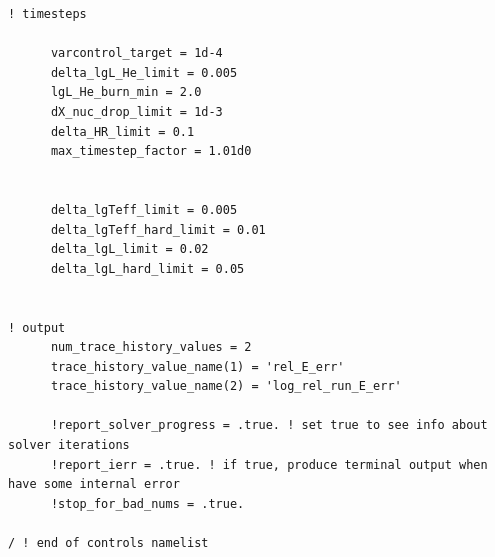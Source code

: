 \documentclass[a4paper,10pt]{article}
\begin{document}
\begin{verbatim}
! timesteps

      varcontrol_target = 1d-4
      delta_lgL_He_limit = 0.005
      lgL_He_burn_min = 2.0
      dX_nuc_drop_limit = 1d-3
      delta_HR_limit = 0.1
      max_timestep_factor = 1.01d0


      delta_lgTeff_limit = 0.005
      delta_lgTeff_hard_limit = 0.01
      delta_lgL_limit = 0.02 
      delta_lgL_hard_limit = 0.05


! output
      num_trace_history_values = 2
      trace_history_value_name(1) = 'rel_E_err'
      trace_history_value_name(2) = 'log_rel_run_E_err'

      !report_solver_progress = .true. ! set true to see info about solver iterations
      !report_ierr = .true. ! if true, produce terminal output when have some internal error
      !stop_for_bad_nums = .true.

/ ! end of controls namelist


\end{verbatim}
\end{document}
